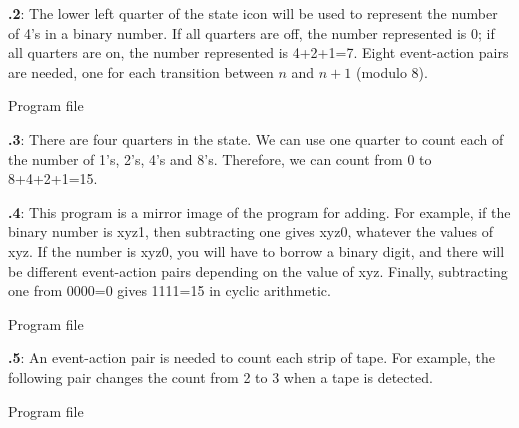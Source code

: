 \documentclass[12pt,a4paper,english]{article}
\begin{document}
\textbf{\thesection.2}:
The lower left quarter of the state icon will be used to represent the
number of 4's in a binary number. If all quarters are off, the number represented
is 0; if all quarters are on, the number represented is 4+2+1=7.
Eight event-action pairs are needed, one for each transition between $n$ and
$n+1$ (modulo 8).

{\raggedleft \hfill Program file }


\textbf{\thesection.3}:
There are four quarters in the state. We can use one quarter to count
each of the number of 1's, 2's, 4's and 8's. Therefore, we can count
from 0 to 8+4+2+1=15.


\textbf{\thesection.4}:
This program is a mirror image of the program for adding.
For example, if the binary number is xyz1,
then subtracting one gives xyz0, whatever the values of xyz.
If the number is xyz0, you will have to borrow a binary digit,
and there will be different event-action pairs depending on the value
of xyz. Finally, subtracting one from 0000=0 gives 1111=15 in cyclic
arithmetic.

{\raggedleft \hfill Program file }

\textbf{\thesection.5}:
An event-action pair is needed to count each strip of tape.
For example, the following 
pair  changes the count from 2 to 3 when a tape is detected.

{\raggedleft \hfill Program file }
\end{document}
